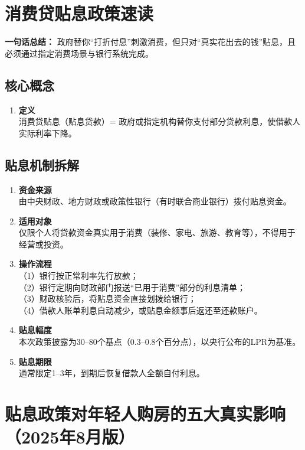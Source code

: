 \section{消费贷贴息政策速读}
\textbf{一句话总结：}  
政府替你“打折付息”刺激消费，但只对“真实花出去的钱”贴息，且必须通过指定消费场景与银行系统完成。

\subsection{核心概念}
\begin{enumerate}[leftmargin=*, nosep]
    \item \textbf{定义}  \\
    消费贷贴息（贴息贷款）= 政府或指定机构替你支付部分贷款利息，使借款人实际利率下降。
\end{enumerate}

\subsection{贴息机制拆解}
\begin{enumerate}[leftmargin=*, nosep]
    \item \textbf{资金来源}  \\
    由中央财政、地方财政或政策性银行（有时联合商业银行）拨付贴息资金。
    \item \textbf{适用对象}  \\
    仅限个人将贷款资金真实用于消费（装修、家电、旅游、教育等），不得用于经营或投资。
    \item \textbf{操作流程}  \\
    （1）银行按正常利率先行放款； \\
    （2）银行定期向财政部门报送“已用于消费”部分的利息清单； \\
    （3）财政核验后，将贴息资金直接划拨给银行； \\
    （4）借款人账单利息自动减少，或贴息金额事后返还至还款账户。
    \item \textbf{贴息幅度}  \\
    本次政策披露为30–80个基点（0.3–0.8个百分点），以央行公布的LPR为基准。
    \item \textbf{贴息期限}  \\
    通常限定1–3年，到期后恢复借款人全额自付利息。
\end{enumerate}


\section{贴息政策对年轻人购房的五大真实影响（2025年8月版）}

